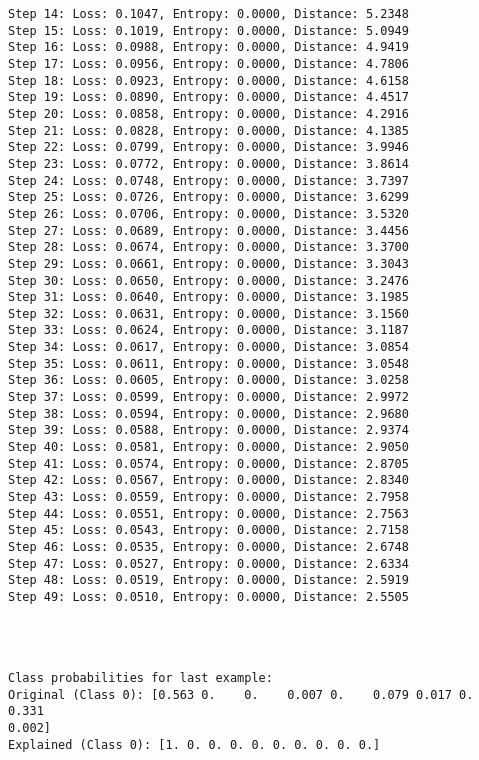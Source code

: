 \documentclass[11pt]{article}
\begin{document}
\begin{Verbatim}[commandchars=\\\{\}]
Step 14: Loss: 0.1047, Entropy: 0.0000, Distance: 5.2348
Step 15: Loss: 0.1019, Entropy: 0.0000, Distance: 5.0949
Step 16: Loss: 0.0988, Entropy: 0.0000, Distance: 4.9419
Step 17: Loss: 0.0956, Entropy: 0.0000, Distance: 4.7806
Step 18: Loss: 0.0923, Entropy: 0.0000, Distance: 4.6158
Step 19: Loss: 0.0890, Entropy: 0.0000, Distance: 4.4517
Step 20: Loss: 0.0858, Entropy: 0.0000, Distance: 4.2916
Step 21: Loss: 0.0828, Entropy: 0.0000, Distance: 4.1385
Step 22: Loss: 0.0799, Entropy: 0.0000, Distance: 3.9946
Step 23: Loss: 0.0772, Entropy: 0.0000, Distance: 3.8614
Step 24: Loss: 0.0748, Entropy: 0.0000, Distance: 3.7397
Step 25: Loss: 0.0726, Entropy: 0.0000, Distance: 3.6299
Step 26: Loss: 0.0706, Entropy: 0.0000, Distance: 3.5320
Step 27: Loss: 0.0689, Entropy: 0.0000, Distance: 3.4456
Step 28: Loss: 0.0674, Entropy: 0.0000, Distance: 3.3700
Step 29: Loss: 0.0661, Entropy: 0.0000, Distance: 3.3043
Step 30: Loss: 0.0650, Entropy: 0.0000, Distance: 3.2476
Step 31: Loss: 0.0640, Entropy: 0.0000, Distance: 3.1985
Step 32: Loss: 0.0631, Entropy: 0.0000, Distance: 3.1560
Step 33: Loss: 0.0624, Entropy: 0.0000, Distance: 3.1187
Step 34: Loss: 0.0617, Entropy: 0.0000, Distance: 3.0854
Step 35: Loss: 0.0611, Entropy: 0.0000, Distance: 3.0548
Step 36: Loss: 0.0605, Entropy: 0.0000, Distance: 3.0258
Step 37: Loss: 0.0599, Entropy: 0.0000, Distance: 2.9972
Step 38: Loss: 0.0594, Entropy: 0.0000, Distance: 2.9680
Step 39: Loss: 0.0588, Entropy: 0.0000, Distance: 2.9374
Step 40: Loss: 0.0581, Entropy: 0.0000, Distance: 2.9050
Step 41: Loss: 0.0574, Entropy: 0.0000, Distance: 2.8705
Step 42: Loss: 0.0567, Entropy: 0.0000, Distance: 2.8340
Step 43: Loss: 0.0559, Entropy: 0.0000, Distance: 2.7958
Step 44: Loss: 0.0551, Entropy: 0.0000, Distance: 2.7563
Step 45: Loss: 0.0543, Entropy: 0.0000, Distance: 2.7158
Step 46: Loss: 0.0535, Entropy: 0.0000, Distance: 2.6748
Step 47: Loss: 0.0527, Entropy: 0.0000, Distance: 2.6334
Step 48: Loss: 0.0519, Entropy: 0.0000, Distance: 2.5919
Step 49: Loss: 0.0510, Entropy: 0.0000, Distance: 2.5505
    \end{Verbatim}

    \begin{center}
    \end{center}
    { \hspace*{\fill} \\}
    
    \begin{Verbatim}[commandchars=\\\{\}]

Class probabilities for last example:
Original (Class 0): [0.563 0.    0.    0.007 0.    0.079 0.017 0.    0.331
0.002]
Explained (Class 0): [1. 0. 0. 0. 0. 0. 0. 0. 0. 0.]
    \end{Verbatim}


    
    
    
\end{document}
